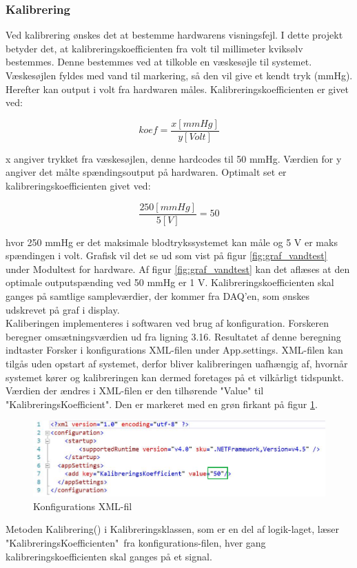 \subsubsection{Kalibrering}
Ved kalibrering ønskes det at bestemme hardwarens visningsfejl. I dette projekt betyder det, at kalibreringskoefficienten fra volt til millimeter kviksølv bestemmes. Denne bestemmes ved at tilkoble en væskesøjle til systemet. Væskesøjlen fyldes med vand til markering, så den vil give et kendt tryk (mmHg). Herefter kan output i volt fra hardwaren måles. Kalibreringskoefficienten er givet ved:
\begin{ceqn}
\begin{equation}
koef=\dfrac{x [mmHg]}{y [Volt]}
\end{equation}
\end{ceqn}
x angiver trykket fra væskesøjlen, denne hardcodes til 50 mmHg. Værdien for y angiver det målte spændingsoutput på hardwaren. Optimalt set er kalibreringskoefficienten givet ved:
\begin{ceqn}
\begin{equation}
\dfrac{250 [mmHg]}{5 [V]}=50
\end{equation}
\end{ceqn}
hvor 250 mmHg er det maksimale blodtrykssystemet kan måle og 5 V er maks spændingen i volt. Grafisk vil det se ud som vist på figur \ref{fig:graf_vandtest} under Modultest for hardware. Af figur \ref{fig:graf_vandtest} kan det aflæses at den optimale outputspænding ved 50 mmHg er 1 V. Kalibreringskoefficienten skal ganges på samtlige sampleværdier, der kommer fra DAQ’en, som ønskes udskrevet på graf i display.\\ 
Kaliberingen implementeres i softwaren ved brug af konfiguration. Forskeren beregner omsætningsværdien ud fra ligning 3.16. Resultatet af denne beregning indtaster Forsker i konfigurations XML-filen under App.settings. XML-filen kan tilgås uden opstart af systemet, derfor bliver kalibreringen uafhængig af, hvornår systemet kører og kalibreringen kan dermed foretages på et vilkårligt tidspunkt. Værdien der ændres i XML-filen er den tilhørende "Value" til "KalibreringsKoefficient". Den er markeret med en grøn firkant på figur \ref{fig:XML-fil}.
\begin{figure}[H]
	\centering
	\includegraphics[width=1.0\textwidth]{Figurer/XMLConfig}
	\caption{Konfigurations XML-fil}
	\label{fig:XML-fil}
\end{figure}
Metoden Kalibrering() i Kalibreringsklassen, som er en del af logik-laget, læser "KalibreringsKoefficienten"\ fra konfigurations-filen, hver gang kalibreringskoefficienten skal ganges på et signal. 


